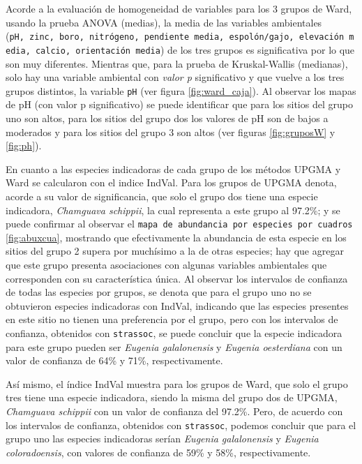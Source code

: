 \documentclass[11pt,]{article}
\begin{document}
Acorde a la evaluación de homogeneidad de variables para los 3 grupos de
Ward, usando la prueba ANOVA (medias), la media de las variables
ambientales
(\texttt{pH,\ zinc,\ boro,\ nitrógeno,\ pendiente\ media,\ espolón/gajo,\ elevación\ media,\ calcio,\ orientación\ media})
de los tres grupos es significativa por lo que son muy diferentes.
Mientras que, para la prueba de Kruskal-Wallis (medianas), solo hay una
variable ambiental con \emph{valor p} significativo y que vuelve a los
tres grupos distintos, la variable \texttt{pH} (ver figura
\ref{fig:ward_caja}). Al observar los mapas de pH (con valor p
significativo) se puede identificar que para los sitios del grupo uno
son altos, para los sitios del grupo dos los valores de pH son de bajos
a moderados y para los sitios del grupo 3 son altos (ver figuras
\ref{fig:gruposW} y \ref{fig:ph}).

En cuanto a las especies indicadoras de cada grupo de los métodos UPGMA
y Ward se calcularon con el indice IndVal. Para los grupos de UPGMA
denota, acorde a su valor de significancia, que solo el grupo dos tiene
una especie indicadora, \emph{Chamguava schippii}, la cual representa a
este grupo al 97.2\%; y se puede confirmar al observar el
\texttt{mapa\ de\ abundancia\ por\ especies\ por\ cuadros}
\ref{fig:abuxcua}, mostrando que efectivamente la abundancia de esta
especie en los sitios del grupo 2 supera por muchísimo a la de otras
especies; hay que agregar que este grupo presenta asociaciones con
algunas variables ambientales que corresponden con su característica
única. Al observar los intervalos de confianza de todas las especies por
grupos, se denota que para el grupo uno no se obtuvieron especies
indicadoras con IndVal, indicando que las especies presentes en este
sitio no tienen una preferencia por el grupo, pero con los intervalos de
confianza, obtenidos con \texttt{strassoc}, se puede concluir que la
especie indicadora para este grupo pueden ser \emph{Eugenia
galalonensis} y \emph{Eugenia oesterdiana} con un valor de confianza de
64\% y 71\%, respectivamente.

Así mismo, el índice IndVal muestra para los grupos de Ward, que solo el
grupo tres tiene una especie indicadora, siendo la misma del grupo dos
de UPGMA, \emph{Chamguava schippii} con un valor de confianza del
97.2\%. Pero, de acuerdo con los intervalos de confianza, obtenidos con
\texttt{strassoc}, podemos concluir que para el grupo uno las especies
indicadoras serían \emph{Eugenia galalonensis} y \emph{Eugenia
coloradoensis}, con valores de confianza de 59\% y 58\%,
respectivamente.
\end{document}
